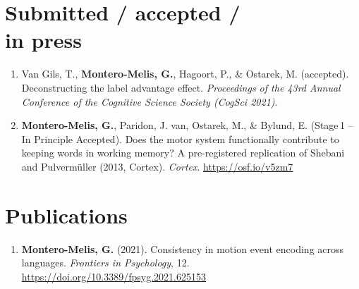 \documentclass[margin, 11pt]{res} %
\begin{document}
\begin{resume}


\section{\sc Submitted / accepted /\\in press}



\begin{enumerate}

\item Van Gils, T., \textbf{Montero-Melis, G.}, Hagoort, P., \& Ostarek, M. (accepted). Deconstructing the label advantage effect. \textit{Proceedings of the 43rd Annual Conference of the Cognitive Science Society (CogSci 2021)}.

\item \textbf{Montero-Melis, G.}, Paridon, J. van, Ostarek, M., \& Bylund, E. (Stage\,1 -- In Principle Accepted). Does the motor system functionally contribute to keeping words in working memory? A pre-registered replication of Shebani and Pulvermüller (2013, Cortex). \emph{Cortex}. \url{https://osf.io/v5zm7}

\end{enumerate}


\section{\sc Publications}



\begin{enumerate}

	\item \textbf{Montero-Melis, G.} (2021). Consistency in motion event encoding across languages. \emph{Frontiers in Psychology}, 12. \url{https://doi.org/10.3389/fpsyg.2021.625153}


\end{enumerate}
\end{resume}
\end{document}
